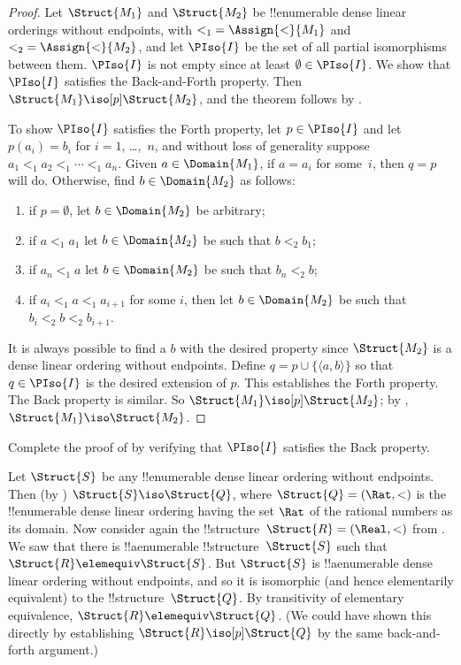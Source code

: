 \documentclass[../../../include/open-logic-section]{subfiles}
\begin{document}
\begin{proof}
  Let $\Struct{M_1}$ and $\Struct{M_2}$ be !!{enumerable} dense linear
  orderings without endpoints, with ${<_1} = \Assign{<}{M_1}$ and ${<_2} =
  \Assign{<}{M_2}$, and let $\PIso{I}$ be the set of all partial
  isomorphisms between them. $\PIso{I}$ is not empty since at least
  $\emptyset \in \PIso{I}$. We show that $\PIso{I}$ satisfies the
  Back-and-Forth property.  Then $\Struct{M_1} \iso[p] \Struct{M_2}$,
  and the theorem follows by .

  To show $\PIso{I}$ satisfies the Forth property, let $p \in
  \PIso{I}$ and let $p(a_i) = b_i$ for $i = 1$, \dots,~$n$, and
  without loss of generality suppose $a_1 <_1 a_2 <_1 \cdots <_1
  a_n$. Given $a \in \Domain{M_1}$, if $a = a_i$ for some~$i$, then $q = p$
  will do. Otherwise, find $b \in \Domain{M_2}$ as follows:
  \begin{enumerate}
  \item if $p = \emptyset$, let $b \in \Domain{M_2}$ be arbitrary;
  \item if $a <_1 a_1$ let $b \in \Domain{M_2}$ be such that $b <_2
    b_1$;
  \item if $a_n <_1 a$ let $b \in \Domain{M_2}$ be such that $b_n <_2 b$;
 \item if $a_i <_1 a <_1 a_{i+1}$ for some $i$, then let $b \in
   \Domain{M_2}$ be such that $b_i <_2 b <_2 b_{i+1}$.
  \end{enumerate}
  It is always possible to find a $b$ with the desired property since
  $\Struct{M_2}$ is a dense linear ordering without endpoints. Define
  $q = p \cup \{ \langle a, b \rangle \}$ so that $q \in \PIso{I}$ is
  the desired extension of $p$. This establishes the Forth
  property. The Back property is similar. So $\Struct{M_1} \iso[p]
  \Struct{M_2}$; by , $\Struct{M_1} \iso
  \Struct{M_2}$.
\end{proof}

\begin{prob}
  Complete the proof of  by
  verifying that $\PIso{I}$ satisfies the Back property.
\end{prob}

\begin{rem}
  Let $\Struct{S}$ be any !!{enumerable} dense linear ordering without
  endpoints. Then (by ) $\Struct{S} \iso
  \Struct{Q}$, where $\Struct{Q} = (\Rat, <)$ is the !!{enumerable}
  dense linear ordering having the set $\Rat$ of the rational numbers
  as its domain. Now consider again the !!{structure}~$\Struct{R} =
  (\Real, <)$ from . We saw that there is
  !!a{enumerable} !!{structure}~$\Struct{S}$ such that $\Struct{R}
  \elemequiv \Struct{S}$. But $\Struct{S}$ is !!a{enumerable} dense
  linear ordering without endpoints, and so it is isomorphic (and
  hence elementarily equivalent) to the !!{structure}~$\Struct{Q}$. By
  transitivity of elementary equivalence, $\Struct{R} \elemequiv
  \Struct{Q}$. (We could have shown this directly by establishing
  $\Struct{R} \iso[p] \Struct{Q}$ by the same back-and-forth
  argument.)
\end{rem}
\end{document}
